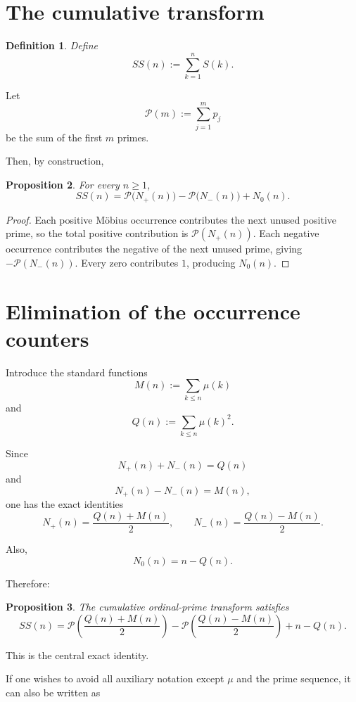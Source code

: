 \documentclass[11pt]{amsart}
\newtheorem{definition}{Definition}[section]
\newtheorem{proposition}[definition]{Proposition}
\newcommand{\mob}{\mu}
\newcommand{\Mert}{M}
\newcommand{\Sq}{Q}
\newcommand{\PS}{\mathcal P}
\begin{document}
\section{The cumulative transform}

\begin{definition}
Define
\[
\boxed{
SS(n):=\sum_{k=1}^{n}S(k).
}
\]
\end{definition}

Let
\[
\PS(m):=\sum_{j=1}^{m}p_j
\]
be the sum of the first $m$ primes.

Then, by construction,

\begin{proposition}
For every $n\ge1$,
\[
\boxed{
SS(n)
=
\PS\bigl(N_+(n)\bigr)
-
\PS\bigl(N_-(n)\bigr)
+
N_0(n).
}
\]
\end{proposition}

\begin{proof}
Each positive M\"obius occurrence contributes the next unused positive prime, so the total positive contribution is $\PS(N_+(n))$. Each negative occurrence contributes the negative of the next unused prime, giving $-\PS(N_-(n))$. Every zero contributes $1$, producing $N_0(n)$.
\end{proof}

\section{Elimination of the occurrence counters}

Introduce the standard functions
\[
\Mert(n):=\sum_{k\le n}\mob(k)
\]
and
\[
\Sq(n):=\sum_{k\le n}\mob(k)^2.
\]

Since
\[
N_+(n)+N_-(n)=\Sq(n)
\]
and
\[
N_+(n)-N_-(n)=\Mert(n),
\]
one has the exact identities
\[
\boxed{
N_+(n)=\frac{\Sq(n)+\Mert(n)}2,
\qquad
N_-(n)=\frac{\Sq(n)-\Mert(n)}2.
}
\]

Also,
\[
\boxed{
N_0(n)=n-\Sq(n).
}
\]

Therefore:

\begin{proposition}
The cumulative ordinal-prime transform satisfies
\[
\boxed{
SS(n)
=
\PS\!\left(\frac{\Sq(n)+\Mert(n)}2\right)
-
\PS\!\left(\frac{\Sq(n)-\Mert(n)}2\right)
+
n-\Sq(n).
}
\]
\end{proposition}

This is the central exact identity.

If one wishes to avoid all auxiliary notation except $\mob$ and the prime sequence, it can also be written as
\end{document}
